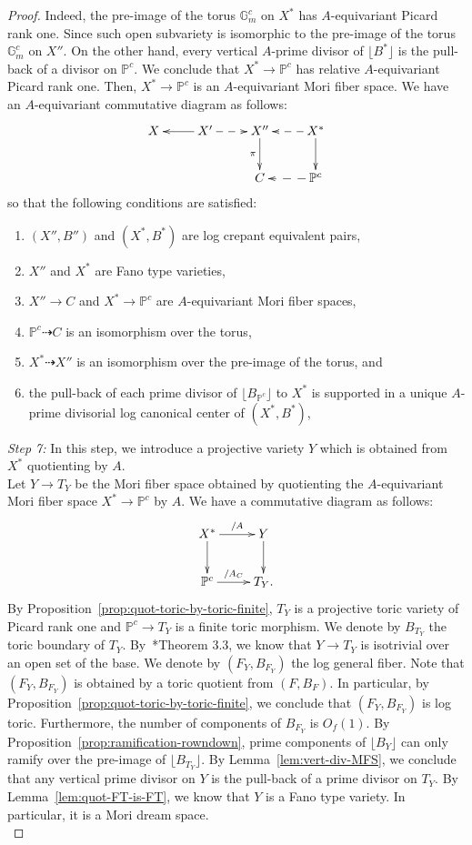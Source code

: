 \documentclass{amsart}
\newcommand{\pp}{\mathbb{P}}
\theoremstyle{remark}
\numberwithin{equation}{section}
\begin{document}
\begin{proof}
Indeed, the pre-image of the torus $\mathbb{G}_m^c$ on $X^*$ has $A$-equivariant Picard rank one. Since such open subvariety is isomorphic 
to the pre-image of the torus $\mathbb{G}_m^c$ on $X''$.
On the other hand, every vertical $A$-prime divisor of $\lfloor B^*\rfloor$
is the pull-back of a divisor on $\pp^c$.
We conclude that $X^*\rightarrow \pp^c$ has
relative $A$-equivariant Picard rank one.
Then, $X^*\rightarrow \pp^c$ is an $A$-equivariant Mori fiber space.
We have an $A$-equivariant commutative diagram as follows:
\[
\xymatrix{
X & X'\ar[l]\ar@{-->}[r] &
X''\ar[d]_-{\pi}  & X^*\ar@{-->}[l]\ar[d] \\
& & C & \pp^c\ar@{-->}[l] \\
}
\]
so that the following conditions are satisfied:
\begin{enumerate}
\item $(X'',B'')$ and $(X^*,B^*)$ are log crepant equivalent  pairs, 
\item $X''$ and $X^*$ are Fano type varieties,
\item $X''\rightarrow C$ and $X^*\rightarrow \pp^c$ are
$A$-equivariant Mori fiber spaces, 
\item $\pp^c\dashrightarrow C$ is an isomorphism over the torus, 
\item $X^*\dashrightarrow X''$ is an isomorphism over the pre-image of the torus, and
\item the pull-back of each prime divisor of $\lfloor B_{\pp^c}\rfloor$ to $X^*$ is supported in a unique $A$-prime divisorial log canonical center of $(X^*,B^*)$,
\end{enumerate}

\textit{Step 7:} In this step, we introduce a projective variety $Y$ which is obtained from $X^*$ quotienting by $A$.\\

Let $Y\rightarrow T_Y$ be the Mori fiber space obtained by quotienting 
the $A$-equivariant Mori fiber space $X^*\rightarrow \pp^c$ by $A$.
We have a commutative diagram as follows:
\[
\xymatrix{
X^*\ar[r]^-{/A}\ar[d] & Y\ar[d] \\
\pp^c \ar[r]^-{/A_C} & T_Y.
}
\]
By Proposition~\ref{prop:quot-toric-by-toric-finite}, $T_Y$ is a projective toric variety of Picard rank one
and $\pp^c\rightarrow T_Y$ is a finite toric morphism.
We denote by $B_{T_Y}$ the toric boundary of $T_Y$.
By~\cite{Amb05}*{Theorem 3.3}, we know that $Y\rightarrow T_Y$ is isotrivial over an open set of the base.
We denote by $(F_Y,B_{F_Y})$ the log general fiber.
Note that $(F_Y,B_{F_Y})$ is obtained by a toric quotient 
from $(F,B_F)$.
In particular, by Proposition~\ref{prop:quot-toric-by-toric-finite}, we conclude that $(F_Y,B_{F_Y})$ is log toric. 
Furthermore, the number of components of $B_{F_Y}$ is $O_f(1)$.
By Proposition~\ref{prop:ramification-rowndown}, prime components of $\lfloor B_Y\rfloor$ can only ramify over the pre-image of $\lfloor B_{T_Y}\rfloor$.
By Lemma~\ref{lem:vert-div-MFS}, we conclude that any vertical prime  divisor on $Y$ is the pull-back of a prime divisor on $T_Y$.
By Lemma~\ref{lem:quot-FT-is-FT}, we know that $Y$ is a Fano type variety. In particular, it is a Mori dream space.\\


\end{proof}
\end{document}
